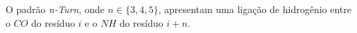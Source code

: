 O padrão \textit{n-Turn}, onde $n \in \{3, 4, 5\}$, apresentam uma ligação de hidrogênio entre o $CO$ do resíduo $i$ e o $NH$ do resíduo $i+n$.
















